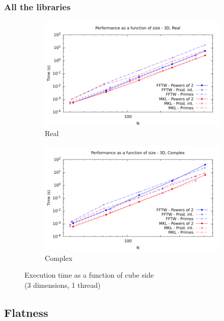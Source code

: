 \documentclass[12pt, a4paper]{article}
\begin{document}
\subsubsection{All the libraries}
\begin{figure}[H]
\captionsetup{width=0.8\linewidth}
\centering
\begin{subfigure}{.5\textwidth}
\centering
\includegraphics[width=.9\linewidth]{graphs/performance/3d-r.pdf}
\caption{Real}
\label{3DR}
\end{subfigure}%
\begin{subfigure}{.5\textwidth}
\centering
\includegraphics[width=.9\linewidth]{graphs/performance/3d-c.pdf}
\caption{Complex}
\label{3DC}
\end{subfigure}
\caption{Execution time as a function of cube side\\(3 dimensions, 1 thread)}
\label{2D}
\end{figure}

\subsection{Flatness}
\end{document}
